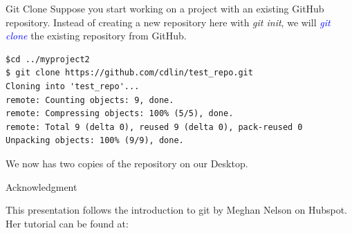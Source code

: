 \documentclass[11pt]{beamer}
\begin{document}
\begin{frame}[fragile]{Git Clone}
Suppose you start working on a project with an existing GitHub repository. Instead of creating a new repository here with \emph{git init}, we will \textcolor{blue}{\emph{git clone}} the existing repository from GitHub.
\begin{lstlisting}
$cd ../myproject2
$ git clone https://github.com/cdlin/test_repo.git
Cloning into 'test_repo'...
remote: Counting objects: 9, done.
remote: Compressing objects: 100% (5/5), done.
remote: Total 9 (delta 0), reused 9 (delta 0), pack-reused 0
Unpacking objects: 100% (9/9), done.
\end{lstlisting}
We now has two copies of the repository on our Desktop.
\end{frame}

\begin{frame}[fragile]{Acknowledgment}

This presentation follows the introduction to git by Meghan Nelson on Hubspot. Her tutorial can be found at: \href{https://product.hubspot.com/blog/git-and-github-tutorial-for-beginners}{\color{blue}{https://product.hubspot.com/blog/git-and-github-tutorial-for-beginners}}
\end{frame}

\end{document}
